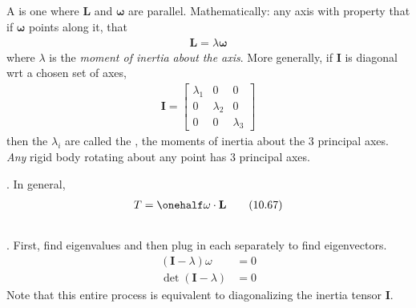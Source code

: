 \documentclass[10pt, twocolumn]{article}
\newcommand{\myspace}{\vspace{3\bigskipamount}}
\newcommand\p{\Needspace{10\baselineskip} \noindent}
\newcommand\tlab[1]{\tag{#1}\label{#1}}
\begin{document}
\myspace
\subsection{}

\p A  is one where $\mathbf{L}$ and $\bm \omega$ are parallel. Mathematically: any axis with property that if $\bm \omega$ points along it, that 
\begin{align}
\mathbf{L} = \lambda \bm \omega \tlab{10.65}
\end{align}
where $\lambda$ is the \textit{moment of inertia about the axis}. More generally, if $\mathbf I$ is diagonal wrt a chosen set of axes, 
\begin{align}
\mathbf I = 
	\begin{bmatrix}
		\lambda_1 & 0 & 0 \\
		0 & \lambda_2 & 0 \\
		0 & 0 & \lambda_3 
	\end{bmatrix}
\end{align}
then the $\lambda_i$ are called the , the moments of inertia about the 3 principal axes. \emph{Any} rigid body rotating about any point has 3 principal axes. 


\myspace \p {}. In general, 
\begin{align}
T = \onehalf \omega \cdot \mathbf L \tlab{10.67}
\end{align}

\myspace
{}
\subsection{}

\p {}. First, find eigenvalues and then plug in each separately to find eigenvectors. 
\begin{align}
	(\mathbf{I} - \lambda) \omega &= 0 \tlab{10.70} \\
	\det(\mathbf I - \lambda) &= 0 \tlab{10.71} 
\end{align}
Note that this entire process is equivalent to diagonalizing the inertia tensor $\mathbf I$. 

\myspace
\subsection{}
\end{document}
